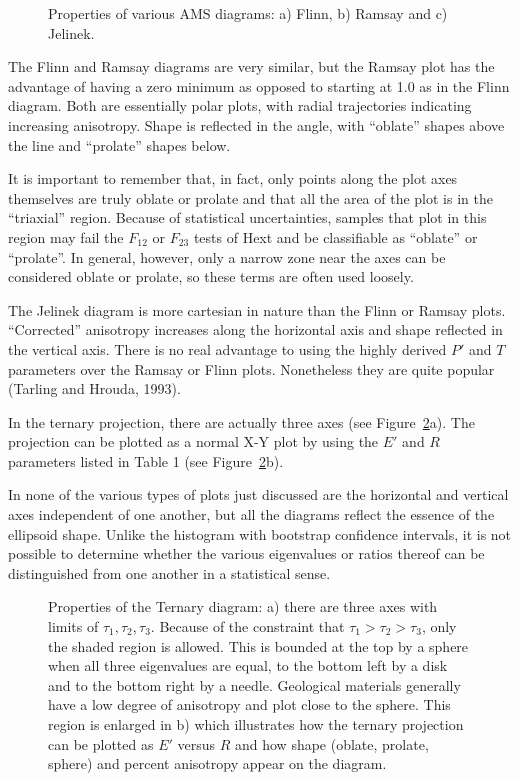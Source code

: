 \begin{figure}[htb]
\epsfxsize 13cm
\centering {}
\caption{Properties of various AMS diagrams: a) Flinn,  b) Ramsay and c)
Jelinek.}
\label{fig:diags}
\end{figure}




The Flinn and Ramsay diagrams are very similar, but the Ramsay plot has the
advantage of having a zero minimum as opposed to starting at 1.0 as in
the Flinn diagram.  Both are essentially polar plots, with 
radial trajectories indicating increasing anisotropy.  Shape is
reflected in the angle, with ``oblate'' shapes above the line and ``prolate''
shapes below.  

It is important to remember that, in fact, only points along the
plot axes themselves are truly
oblate or prolate and that all the area of the plot is in the ``triaxial''
region.  Because of statistical uncertainties, samples that plot in this region may fail the $F_{12}$ or $F_{23}$ tests of Hext and be classifiable as
``oblate'' or ``prolate''.  In general, however, only a narrow zone near
the axes can be considered oblate or prolate, so these terms are often
used loosely. 

   The Jelinek diagram is more cartesian in nature than the Flinn or Ramsay
plots.  ``Corrected'' anisotropy increases along the horizontal axis and shape
reflected in the vertical axis.  There is no real advantage to using the highly
derived $P'$ and $T$ parameters over the Ramsay or Flinn plots.  Nonetheless
they are quite popular 
 (Tarling and Hrouda, 1993).  \nocite{tarling93}


In the ternary
projection, there are actually three axes (see Figure~\ref{fig:tern1}a).
The projection can be plotted  as a normal X-Y plot by using the $E'$ and
$R$ parameters listed in Table 1 (see Figure~\ref{fig:tern1}b).

  In none of the various types of  plots  just discussed are the
horizontal and vertical axes independent of one another, but all the
diagrams reflect the essence of the ellipsoid shape.  
Unlike the histogram with bootstrap confidence intervals,
it is not possible to determine whether the
various eigenvalues or ratios thereof can be distinguished from one another
 in a statistical sense.

\begin{figure}[htb]
\epsfxsize 12cm
\centering {}
\caption{Properties of the Ternary diagram: a) there are three axes
with limits of $\tau_1,\tau_2, \tau_3$.  Because of the constraint that
$\tau_1>\tau_2>\tau_3$, only the shaded region is allowed. This is
bounded at the top by a sphere when all three eigenvalues are equal, to
the bottom left by a disk and to the bottom right by a
needle.  Geological materials generally have a low degree of anisotropy
and plot close to the sphere.  This region is enlarged in b) which
illustrates how the ternary projection can be plotted as $E'$ versus
$R$ and how  shape (oblate, prolate, sphere) and 
percent anisotropy appear on the diagram. }
\label{fig:tern1}
\end{figure}


